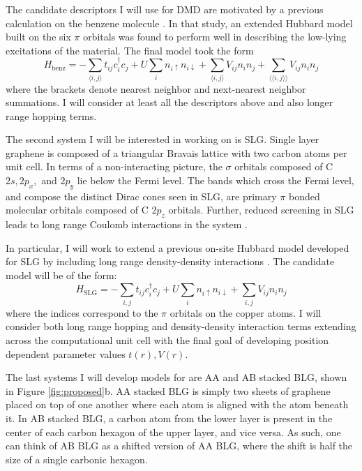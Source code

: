\documentclass[12pt]{article}
\begin{document}
The candidate descriptors I will use for DMD are motivated by a previous calculation on the benzene molecule \cite{Wagner2015}.
In that study, an extended Hubbard model built on the six $\pi$ orbitals was found to perform well in describing the low-lying excitations of the material.
The final model took the form 
\begin{equation}
H_\text{benz} = -\sum_{\langle i,j \rangle} t_{ij}c_i^\dagger c_j + U \sum_i n_{i\uparrow}n_{i\downarrow}  + \sum_{\langle i,j \rangle}V_{ij} n_i n_j + \sum_{\langle \langle i,j \rangle\rangle}V_{ij} n_i n_j
\label{Hbenz}
\end{equation}
where the brackets denote nearest neighbor and next-nearest neighbor summations.
I will consider at least all the descriptors above and also longer range hopping terms.

The second system I will be interested in working on is SLG.
Single layer graphene is composed of a triangular Bravais lattice with two carbon atoms per unit cell.
In terms of a non-interacting picture, the $\sigma$ orbitals composed of C $2s, 2p_x,$ and $2p_y$ lie below the Fermi level.
The bands which cross the Fermi level, and compose the distinct Dirac cones seen in SLG, are primary $\pi$ bonded molecular orbitals composed of C $2p_z$ orbitals.
Further, reduced screening in SLG leads to long range Coulomb interactions in the system \cite{Elias2012, Yu2013}.

In particular, I will work to extend a previous on-site Hubbard model developed for SLG \cite{Zheng2017, Wagner2015} by including long range density-density interactions .
The candidate model will be of the form:
\begin{equation}
H_\text{SLG} = -\sum_{i,j} t_{ij}c_i^\dagger c_j + U \sum_i n_{i\uparrow}n_{i\downarrow}  + \sum_{i,j} V_{ij} n_i n_j
\label{Hslg}
\end{equation}
where the indices correspond to the $\pi$ orbitals on the copper atoms.
I will consider both long range hopping and density-density interaction terms extending across the computational unit cell with the final goal of developing position dependent parameter values $t(r), V(r)$.

The last systems I will develop models for are AA and AB stacked BLG, shown in Figure \ref{fig:proposed}b.
AA stacked BLG is simply two sheets of graphene placed on top of one another where each atom is aligned with the atom beneath it.
In AB stacked BLG, a carbon atom from the lower layer is present in the center of each carbon hexagon of the upper layer, and vice versa.
As such, one can think of AB BLG as a shifted version of AA BLG, where the shift is half the size of a single carbonic hexagon.
\end{document}
